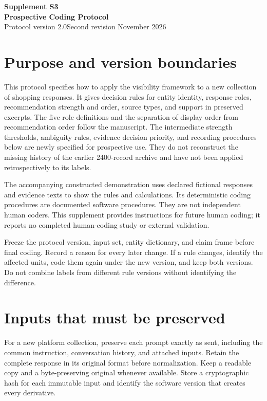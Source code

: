 \documentclass[10pt,a4paper]{article}
\begin{document}
\begin{center}
{\Large\bfseries Supplement S3}\\[3pt]
{\Large\bfseries Prospective Coding Protocol}\\[4pt]
Protocol version 2.0\quad Second revision November 2026
\end{center}

\section{Purpose and version boundaries}
This protocol specifies how to apply the visibility framework to a new collection of shopping responses. It gives decision rules for entity identity, response roles, recommendation strength and order, source types, and support in preserved excerpts. The five role definitions and the separation of display order from recommendation order follow the manuscript. The intermediate strength thresholds, ambiguity rules, evidence decision priority, and recording procedures below are newly specified for prospective use. They do not reconstruct the missing history of the earlier 2400-record archive and have not been applied retrospectively to its labels.

The accompanying constructed demonstration uses declared fictional responses and evidence texts to show the rules and calculations. Its deterministic coding procedures are documented software procedures. They are not independent human coders. This supplement provides instructions for future human coding; it reports no completed human-coding study or external validation.

Freeze the protocol version, input set, entity dictionary, and claim frame before final coding. Record a reason for every later change. If a rule changes, identify the affected units, code them again under the new version, and keep both versions. Do not combine labels from different rule versions without identifying the difference.

\section{Inputs that must be preserved}
For a new platform collection, preserve each prompt exactly as sent, including the common instruction, conversation history, and attached inputs. Retain the complete response in its original format before normalization. Keep a readable copy and a byte-preserving original whenever available. Store a cryptographic hash for each immutable input and identify the software version that creates every derivative.
\end{document}
